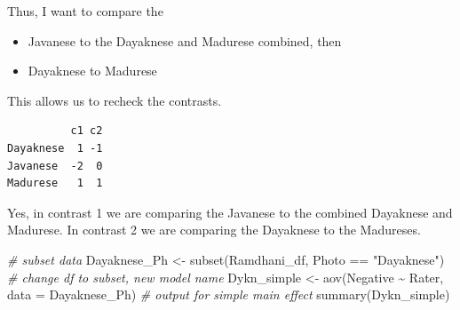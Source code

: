 \documentclass[
  11pt,
]{book}
\newenvironment{Shaded}{\begin{snugshade}}{\end{snugshade}}
\newcommand{\AttributeTok}[1]{\textcolor[rgb]{0.77,0.63,0.00}{#1}}
\newcommand{\CommentTok}[1]{\textcolor[rgb]{0.56,0.35,0.01}{\textit{#1}}}
\newcommand{\DecValTok}[1]{\textcolor[rgb]{0.00,0.00,0.81}{#1}}
\newcommand{\FunctionTok}[1]{\textcolor[rgb]{0.00,0.00,0.00}{#1}}
\newcommand{\NormalTok}[1]{#1}
\newcommand{\OtherTok}[1]{\textcolor[rgb]{0.56,0.35,0.01}{#1}}
\newcommand{\SpecialCharTok}[1]{\textcolor[rgb]{0.00,0.00,0.00}{#1}}
\newcommand{\StringTok}[1]{\textcolor[rgb]{0.31,0.60,0.02}{#1}}
\providecommand{\tightlist}{%
  \setlength{\itemsep}{0pt}\setlength{\parskip}{0pt}}
\begin{document}
Thus, I want to compare the

\begin{itemize}
\tightlist
\item
  Javanese to the Dayaknese and Madurese combined, then
\item
  Dayaknese to Madurese
\end{itemize}

\begin{Shaded}
\end{Shaded}

This allows us to recheck the contrasts.

\begin{Shaded}
\end{Shaded}

\begin{verbatim}
          c1 c2
Dayaknese  1 -1
Javanese  -2  0
Madurese   1  1
\end{verbatim}

Yes, in contrast 1 we are comparing the Javanese to the combined Dayaknese and Madurese. In contrast 2 we are comparing the Dayaknese to the Madureses.

\begin{Shaded}
\begin{Highlighting}[]
\CommentTok{\# subset data}
\NormalTok{Dayaknese\_Ph }\OtherTok{\textless{}{-}} \FunctionTok{subset}\NormalTok{(Ramdhani\_df, Photo }\SpecialCharTok{==} \StringTok{"Dayaknese"}\NormalTok{)}
\CommentTok{\# change df to subset, new model name}
\NormalTok{Dykn\_simple }\OtherTok{\textless{}{-}} \FunctionTok{aov}\NormalTok{(Negative }\SpecialCharTok{\textasciitilde{}}\NormalTok{ Rater, }\AttributeTok{data =}\NormalTok{ Dayaknese\_Ph)}
\CommentTok{\# output for simple main effect}
\FunctionTok{summary}\NormalTok{(Dykn\_simple)}
\end{Highlighting}
\end{Shaded}
\end{document}
